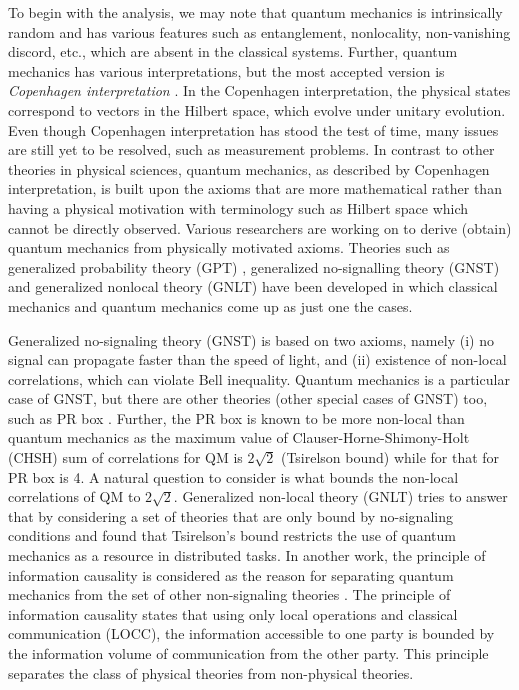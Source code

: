 \documentclass[]{interact}
\theoremstyle{plain}%
\theoremstyle{definition}
\theoremstyle{remark}
\begin{document}
To begin with the analysis, we may note that quantum mechanics is intrinsically random and has various features such as entanglement, nonlocality, non-vanishing discord, etc., which are absent in the classical systems. Further, quantum mechanics has various interpretations, but the most accepted version is \textit{Copenhagen interpretation} \cite{stapp1972copenhagen}. In the Copenhagen interpretation, the physical states correspond to vectors in the Hilbert space, which evolve under unitary evolution. Even though Copenhagen interpretation has stood the test of time, many issues are still yet to be resolved, such as measurement problems. In contrast to other theories in physical sciences, quantum mechanics, as described by Copenhagen interpretation, is built upon the axioms that are more mathematical rather than having a physical motivation with terminology such as Hilbert space which cannot be directly observed. Various researchers are working on to derive (obtain) quantum mechanics from physically motivated axioms. Theories such as generalized probability theory (GPT) \cite{janotta2014generalized,barrett2007information}, generalized no-signalling theory (GNST) \cite{masanes2006general} and generalized nonlocal theory (GNLT) \cite{barrett2005nonlocal} have been developed in which classical mechanics and quantum mechanics come up as just one the cases. 

Generalized no-signaling theory (GNST) \cite{masanes2006general} is based on two axioms, namely (i) no signal can propagate faster than the speed of light, and (ii) existence of non-local correlations, which can violate Bell inequality. Quantum mechanics is a particular case of GNST, but there are other theories (other special cases of GNST) too, such as PR box \cite{popescu1994quantum}. Further, the PR box is known to be more non-local than quantum mechanics as the maximum value of Clauser-Horne-Shimony-Holt (CHSH) sum of correlations for QM is $2\sqrt{2}$ (Tsirelson bound) \cite{cirel1980quantum} while for that for PR box is 4. A natural question to consider is what bounds the non-local correlations of QM to $2\sqrt{2}$. Generalized non-local theory (GNLT) \cite{barrett2005nonlocal} tries to answer that by considering a set of theories that are only bound by no-signaling conditions and found that Tsirelson's bound restricts the use of quantum mechanics as a resource in distributed tasks. In another work, the principle of information causality is considered as the reason for separating quantum mechanics from the set of other non-signaling theories \cite{pawlowski2009information}. The principle of information causality states that using only local operations and classical communication (LOCC), the information accessible to one party is bounded by the information volume of communication from the other party. This principle separates the class of physical theories from non-physical theories. 
\end{document}
